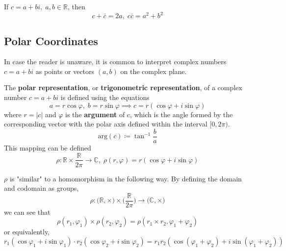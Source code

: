   If $c = a + b i, \; a, b \in \mathbb{R}$, then 
  \begin{equation}
    c + \bar{c} = 2a, \; c \bar{c} = a^2 + b^2
  \end{equation}

\subsection{Polar Coordinates}

  In case the reader is unaware, it is common to interpret complex numbers $c = a + b i$ as points or vectors $(a, b)$ on the complex plane. 

  \begin{definition}
    \label{def:polar-form-of-complex-numbers}
    The \textbf{polar representation}, or \textbf{trigonometric representation}, of a complex number $c = a + b i$ is defined using the equations 
    \begin{equation}
      a = r \cos{\varphi}, \; b = r\sin{\varphi} \implies c = r (\cos{\varphi} + i \sin{\varphi})
    \end{equation}
    where $r = |c|$ and $\varphi$ is the \textbf{argument} of $c$, which is 
    the angle formed by the corresponding vector with the polar axis defined within the interval $[0, 2\pi)$. 
    \begin{equation}
      \text{arg}(c) \coloneqq \tan^{-1}{\frac{b}{a}}
    \end{equation}
    This mapping can be defined 
    \begin{equation}
      \rho: \mathbb{R} \times \frac{\mathbb{R}}{2 \pi} \to \mathbb{C}, \; \rho(r, \varphi) = r (\cos{\varphi} + i \sin{\varphi})
    \end{equation}
  \end{definition}

  \begin{theorem}
    \label{thm:the-argument-as-a-quasi-homomorphism}
    $\rho$ is "similar" to a homomorphism in the following way. By defining the domain and codomain as groups, 
    \begin{equation}
      \rho: \big( \mathbb{R}, \times \big) \times \Big( \frac{\mathbb{R}}{2 \pi} \Big) \to \big( \mathbb{C}, \times \big)
    \end{equation}
    we can see that
    \begin{equation}
      \rho (r_1, \varphi_1) \times \rho(r_2, \varphi_2) = \rho(r_1 \times r_2, \varphi_1 + \varphi_2) 
    \end{equation}
    or equivalently, 
    \begin{equation}
      r_1 (\cos{\varphi_1} + i \sin{\varphi_1}) \cdot r_2 (\cos{\varphi_2} + i \sin{\varphi_2}) = r_1 r_2 (\cos{(\varphi_1 + \varphi_2)} + i \sin{(\varphi_1 + \varphi_2)})
    \end{equation}
  \end{theorem}

